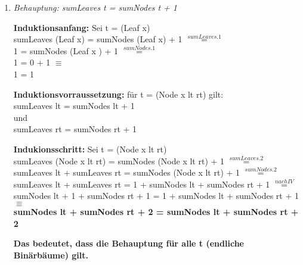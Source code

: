 \documentclass[11pt]{article}
\begin{document}
\begin{enumerate}
\item
\vspace*{0.5cm}
\textit{Behauptung: sumLeaves t = sumNodes t + 1}

\vspace*{0.5cm}
\textbf{Induktionsanfang:} Sei t = (Leaf x)\\
sumLeaves (Leaf x) = sumNodes (Leaf x) + 1 $\stackrel{sumLeaves.1}{=}$\\
1 = sumNodes (Leaf x ) + 1 $\stackrel{sumNodes.1}{=}$\\
1 = 0 + 1 $\equiv$\\
1 = 1

\vspace*{0.5cm}
\textbf{Induktionsvorraussetzung:} für t = (Node x lt rt) gilt:\\
sumLeaves lt = sumNodes lt + 1\\
und\\
sumLeaves rt = sumNodes rt + 1

\vspace*{0.5cm}
\textbf{Indukionsschritt:} Sei t = (Node x lt rt)\\
sumLeaves (Node x lt rt) = sumNodes (Node x lt rt) + 1 $\stackrel{sumLeaves.2}{=}$\\
sumLeaves lt + sumLeaves rt = sumNodes (Node x lt rt) + 1 $\stackrel{sumNodes.2}{=}$\\
sumLeaves lt + sumLeaves rt = 1 + sumNodes lt + sumNodes rt + 1 $\stackrel{nach IV}{=}$\\
sumNodes lt + 1 + sumNodes rt + 1 = 1 + sumNodes lt + sumNodes rt + 1 $\equiv$\\
\textbf{sumNodes lt + sumNodes rt + 2 = sumNodes lt + sumNodes rt + 2}

\vspace*{0.5cm}
\textbf{Das bedeutet, dass die Behauptung für alle t (endliche Binärbäume) gilt.}
\end{enumerate}
\end{document}
